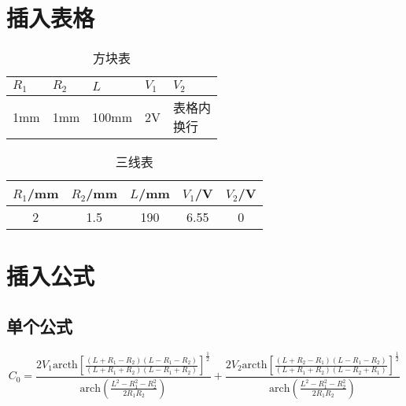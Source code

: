 \documentclass[12pt,a4paper]{article}%
\begin{document}
    \section{插入表格}
    \begin{table}[H]%
    	\centering
            
    	\begin{tabular}{|l|l|l|l|l|}
    		\hline
    		$R_1$ & $R_2$ & $L$ & $V_1$ & $V_2$ \\ \hline
    		1mm & 1mm & 100mm & 2V & \makecell{表格内\\ 换行} \\ \hline
    	\end{tabular}
            \caption{\fontsize{10pt}{15pt}\selectfont 方块表}
            \label{table:1}
    \end{table}
    \begin{table}[H]%
    	\centering
    	\caption{\fontsize{10pt}{15pt}\selectfont 三线表}
    	\begin{tabular}{ccccc}
        	\toprule[2pt]
    		$R_1$/mm & $R_2$/mm & $L$/mm & $V_1$/V & $V_2$/V \\ 
    	\midrule
    		2 & 1.5 & 190 & 6.55 & 0 \\ 
    	\bottomrule[2pt]
    	\end{tabular}
    \end{table}

    \section{插入公式}

    \subsection{单个公式}
    \begin{equation}%
    	C_0=\frac{2V_1\text{arcth}\left[ \frac{\left( L+R_1-R_2 \right) \left( L-R_1-R_2 \right)}{\left( L+R_1+R_2 \right) \left( L-R_1+R_2 \right)} \right] ^{\frac{1}{2}}}{\text{arch}\left( \frac{L^2-R_{1}^{2}-R_{2}^{2}}{2R_1R_2} \right)}+\frac{2V_2\text{arcth}\left[ \frac{\left( L+R_2-R_1 \right) \left( L-R_1-R_2 \right)}{\left( L+R_1+R_2 \right) \left( L-R_2+R_1 \right)} \right] ^{\frac{1}{2}}}{\text{arch}\left( \frac{L^2-R_{1}^{2}-R_{2}^{2}}{2R_1R_2} \right)}
        \label{eq:1}
    \end{equation}
    
\end{document}
